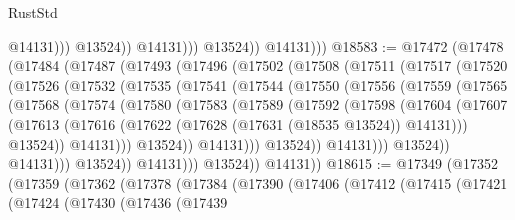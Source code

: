 \begin{lexlean}{RustStd}
\begin{coremodule}
                              @14131)))
                        @13524))
                    @14131)))
              @13524))
          @14131)))
@18583 := @17472
    (@17478
      (@17484
        (@17487
          (@17493
            (@17496
              (@17502
                (@17508
                  (@17511
                    (@17517
                      (@17520
                        (@17526
                          (@17532
                            (@17535
                              (@17541
                                (@17544
                                  (@17550
                                    (@17556
                                      (@17559
                                        (@17565
                                          (@17568
                                            (@17574
                                              (@17580
                                                (@17583
                                                  (@17589
                                                    (@17592
                                                      (@17598
                                                        (@17604
                                                          (@17607
                                                            (@17613
                                                              (@17616
                                                                (@17622
                                                                  (@17628
                                                                    (@17631 (@18535 @13524))
                                                                    @14131)))
                                                              @13524))
                                                          @14131)))
                                                    @13524))
                                                @14131)))
                                          @13524))
                                      @14131)))
                                @13524))
                            @14131)))
                      @13524))
                  @14131)))
            @13524))
        @14131))
@18615 := @17349
    (@17352
      (@17359
        (@17362
          (@17378
            (@17384
              (@17390
                (@17406
                  (@17412
                    (@17415
                      (@17421
                        (@17424
                          (@17430
                            (@17436
                              (@17439

\end{coremodule}
\end{lexlean}
